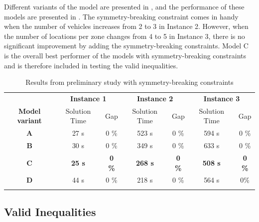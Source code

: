 Different variants of the model are presented in , and the performance of these models are presented in . The symmetry-breaking constraint comes in handy when the number of vehicles increases from 2 to 3 in Instance 2. However, when the number of locations per zone changes from 4 to 5 in Instance 3, there is no significant improvement by adding the symmetry-breaking constraints. Model C is the overall best performer of the models with symmetry-breaking constraints and is therefore included in testing the valid inequalities. 
\\
\begin{table}[H]
    \centering
    \caption{Results from preliminary study with symmetry-breaking constraints}
    \begin{tabular}{c c c c c c c}
        \thickhline
         & \multicolumn{2}{c}{\textbf{Instance 1}} & \multicolumn{2}{c}{\textbf{Instance 2}} & \multicolumn{2}{c}{\textbf{Instance 3}}  \\
        \thickhline
        \textbf{Model variant} & Solution Time & Gap & Solution Time & Gap & Solution Time & Gap \\
        \hline
        \textbf{A} & 27 s & 0 \% & 523 s & 0 \% & 594 s & 0 \% \\
        \textbf{B} & 30 s & 0 \% & 349 s & 0 \% & 633 s & 0 \% \\
        \textbf{C} & \textbf{25 s} & \textbf{0 \%} & \textbf{268 s} & \textbf{0 \%} & \textbf{508 s} & \textbf{0 \%} \\
        \textbf{D} & 44 s & 0 \% & 218 s & 0 \% & 564 s & 0\% \\
        \thickhline
        \end{tabular}
    \label{results_symmetry_preliminary}
\end{table}

\subsection{Valid Inequalities}\label{prelim_val_ineq}

